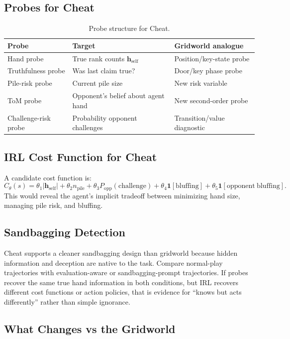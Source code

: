 \documentclass[11pt,a4paper]{article}
\begin{document}
\subsection{Probes for Cheat}

\begin{table}[h]
\centering
\begin{tabular}{lll}
\toprule
Probe & Target & Gridworld analogue \\
\midrule
Hand probe & True rank counts $\mathbf{h}_{\mathrm{self}}$ & Position/key-state probe \\
Truthfulness probe & Was last claim true? & Door/key phase probe \\
Pile-risk probe & Current pile size & New risk variable \\
ToM probe & Opponent's belief about agent hand & New second-order probe \\
Challenge-risk probe & Probability opponent challenges & Transition/value diagnostic \\
\bottomrule
\end{tabular}
\caption{Probe structure for Cheat.}
\end{table}

\subsection{IRL Cost Function for Cheat}

A candidate cost function is:
\[
C_\theta(s)=\theta_1|\mathbf{h}_{\mathrm{self}}|+\theta_2 n_{\mathrm{pile}}+\theta_3P_{\mathrm{opp}}(\mathrm{challenge})+\theta_4\mathbf{1}[\mathrm{bluffing}]+\theta_5\mathbf{1}[\mathrm{opponent\ bluffing}].
\]
This would reveal the agent's implicit tradeoff between minimizing hand size, managing pile risk, and bluffing.

\subsection{Sandbagging Detection}

Cheat supports a cleaner sandbagging design than gridworld because hidden information and deception are native to the task. Compare normal-play trajectories with evaluation-aware or sandbagging-prompt trajectories. If probes recover the same true hand information in both conditions, but IRL recovers different cost functions or action policies, that is evidence for ``knows but acts differently'' rather than simple ignorance.

\subsection{What Changes vs the Gridworld}
\end{document}
